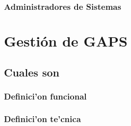 \documentclass[letterpaper,openright,10pt,oneside]{report}
\begin{document}
			\subsection{Administradores de Sistemas}
			\begin{comment}
	\chapter{Control del proyecto}
		\section{Objetivos del control}
		\section{Herramientas (Gantt, Pert)}
		\section{Conjunto de indicadores asociados}
		\section{Fases de la medici'on}
			\subsection{Medir}
			\subsection{Evaluar}
			\subsection{Corregir}
\end{comment}
	
	\chapter{Gestión de GAPS}
		\section{Cuales son}
			\subsection{Definici'on funcional}
			\subsection{Definici'on te'cnica}
\end{document}
